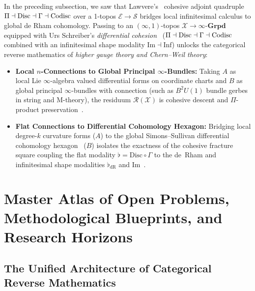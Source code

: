 In the preceding subsection, we saw that Lawvere's~\cite{Lawvere07} cohesive adjoint quadruple $\Pi \dashv \mathrm{Disc} \dashv \Gamma \dashv \mathrm{Codisc}$ over a 1-topos $\mathcal{E} \to \mathcal{S}$ bridges local infinitesimal calculus to global de Rham cohomology. Passing to an $(\infty, 1)$-topos $\mathcal{X} \to \infty\text{-}\mathbf{Grpd}$ equipped with Urs Schreiber's \emph{differential cohesion}~\cite[\S 4.1]{Schreiber13} ($\Pi \dashv \mathrm{Disc} \dashv \Gamma \dashv \mathrm{Codisc}$ combined with an infinitesimal shape modality $\mathrm{Im} \dashv \mathrm{Inf}$) unlocks the categorical reverse mathematics of \emph{higher gauge theory and Chern--Weil theory}:

\begin{itemize}

  \item \textbf{Local $n$-Connections to Global Principal $\infty$-Bundles:} Taking $A$ as local Lie $\infty$-algebra valued differential forms on coordinate charts and $B$ as global principal $\infty$-bundles with connection (such as $B^2 U(1)$ bundle gerbes in string and M-theory), the residuum $\mathcal{R}(\mathcal{X})$ is cohesive descent and $\Pi$-product preservation~\cite[\S 4]{Schreiber13}.

  \item \textbf{Flat Connections to Differential Cohomology Hexagon:} Bridging local degree-$k$ curvature forms ($A$) to the global Simons--Sullivan differential cohomology hexagon~\cite{SimonsSullivan08} ($B$) isolates the exactness of the cohesive fracture square coupling the flat modality $\flat = \mathrm{Disc} \circ \Gamma$ to the de~Rham and infinitesimal shape modalities $\flat_{\mathrm{dR}}$ and $\mathrm{Im}$~\cite[\S 4]{Schreiber13}.

\end{itemize}

\chapter{Master Atlas of Open Problems, Methodological Blueprints, and Research Horizons}

\label{ch:master-atlas}

\section{The Unified Architecture of Categorical Reverse Mathematics}

